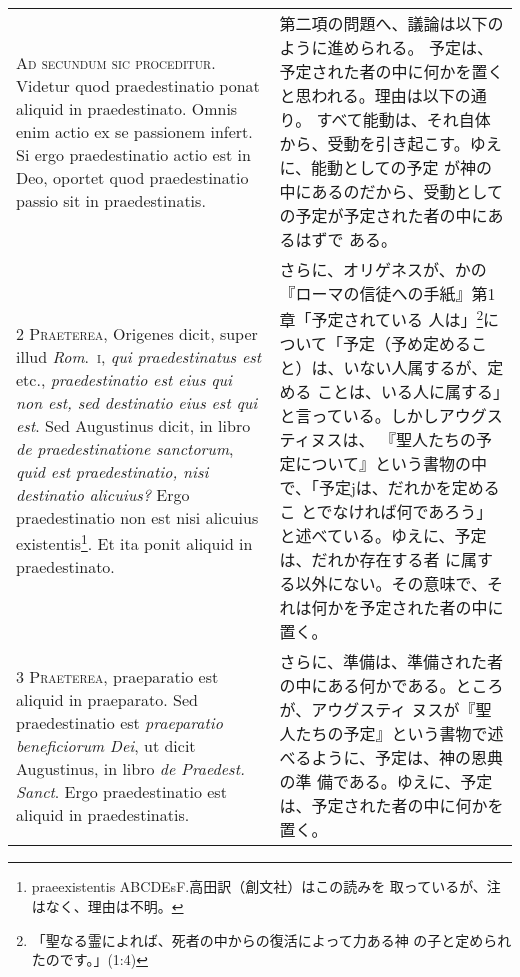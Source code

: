\documentclass[10pt]{jsarticle} %
\begin{document}
\begin{longtable}{p{21em}p{21em}}


{\Huge A}{\scshape d secundum sic proceditur}. Videtur quod
praedestinatio ponat aliquid in praedestinato. Omnis enim actio ex se
passionem infert. Si ergo praedestinatio actio est in Deo, oportet quod
praedestinatio passio sit in praedestinatis.


&

 第二項の問題へ、議論は以下のように進められる。
 予定は、予定された者の中に何かを置くと思われる。理由は以下の通り。
 すべて能動は、それ自体から、受動を引き起こす。ゆえに、能動としての予定
 が神の中にあるのだから、受動としての予定が予定された者の中にあるはずで
 ある。

 
\\


{\scshape 2 Praeterea}, Origenes dicit, super illud
{\itshape Rom}.~{\scshape i}, {\itshape qui praedestinatus est} etc., {\itshape praedestinatio est eius qui non
est, sed destinatio eius est qui est}. Sed Augustinus dicit, in libro {\itshape de
praedestinatione sanctorum}, {\itshape quid est praedestinatio, nisi destinatio
alicuius?} Ergo praedestinatio non est nisi alicuius
 existentis\footnote{praeexistentis ABCDEsF.高田訳（創文社）はこの読みを
 取っているが、注はなく、理由は不明。}. Et ita
ponit aliquid in praedestinato.


&

 さらに、オリゲネスが、かの『ローマの信徒への手紙』第1章「予定されている
 人は」\footnote{「聖なる霊によれば、死者の中からの復活によって力ある神
 の子と定められたのです。」(1:4)}について「予定（予め定めること）は、いない人属するが、定める
 ことは、いる人に属する」と言っている。しかしアウグスティヌスは、
 『聖人たちの予定について』という書物の中で、「予定jは、だれかを定めるこ
 とでなければ何であろう」と述べている。ゆえに、予定は、だれか存在する者
 に属する以外にない。その意味で、それは何かを予定された者の中に置く。

 
\\


{\scshape 3 Praeterea}, praeparatio est aliquid in
praeparato. Sed praedestinatio est {\itshape praeparatio beneficiorum Dei}, ut
dicit Augustinus, in libro {\itshape  de Praedest. Sanct}. Ergo praedestinatio est
aliquid in praedestinatis.


&

 さらに、準備は、準備された者の中にある何かである。ところが、アウグスティ
 ヌスが『聖人たちの予定』という書物で述べるように、予定は、神の恩典の準
 備である。ゆえに、予定は、予定された者の中に何かを置く。


\end{longtable}
\end{document}
